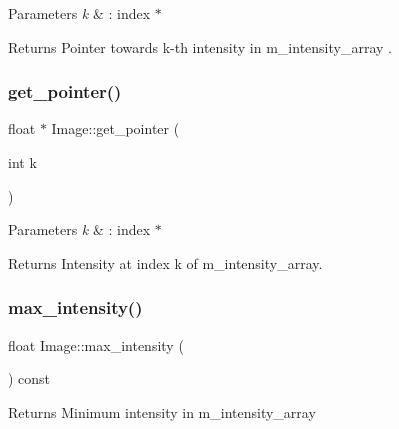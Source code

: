 \begin{DoxyParams}{Parameters}
{\em k} & \+: index $\ast$ \\
\hline
\end{DoxyParams}
\begin{DoxyReturn}{Returns}
Pointer towards k-\/th intensity in m\+\_\+intensity\+\_\+array . 
\end{DoxyReturn}
\mbox{\label{class_image_a71ce9c6b5c2ac2c67a6c0ef807806fe1}} 
\subsubsection{\texorpdfstring{get\+\_\+pointer()}{get\_pointer()}}
{\footnotesize\ttfamily float $\ast$ Image\+::get\+\_\+pointer (\begin{DoxyParamCaption}\item[{int}]{k }\end{DoxyParamCaption})}


\begin{DoxyParams}{Parameters}
{\em k} & \+: index $\ast$ \\
\hline
\end{DoxyParams}
\begin{DoxyReturn}{Returns}
Intensity at index k of m\+\_\+intensity\+\_\+array. 
\end{DoxyReturn}
\mbox{\label{class_image_a71cc86b70dfe64d9e49e578ec9cc35c4}} 
\subsubsection{\texorpdfstring{max\+\_\+intensity()}{max\_intensity()}}
{\footnotesize\ttfamily float Image\+::max\+\_\+intensity (\begin{DoxyParamCaption}{ }\end{DoxyParamCaption}) const}

\begin{DoxyReturn}{Returns}
Minimum intensity in m\+\_\+intensity\+\_\+array 
\end{DoxyReturn}
\mbox{\label{class_image_a3293e639f72645c62e07f5b2b3173100}} 

